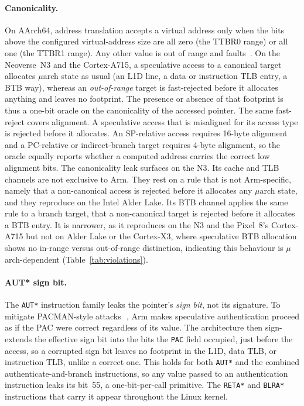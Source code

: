 \documentclass[letterpaper,twocolumn,10pt]{article}
\makeatletter
\theoremstyle{definition}
\def\uarch@bold#1#2\@nil{\if b#1\boldmath\fi}
\DeclareRobustCommand{\uarch}{{\expandafter\uarch@bold\f@series\@nil\ensuremath{\mu}}arch\xspace}
\makeatother
\begin{document}
\paragraph{Canonicality.}
\label{sec:canon-l1d}
On AArch64, address translation accepts a virtual address only when the bits above the
configured virtual-address size are all zero (the TTBR0 range) or all one (the TTBR1 range).
Any other value is out of range and faults~\cite{arm_vmsa}. On the
Neoverse~N3 and the Cortex-A715, a speculative access to a canonical target allocates
\uarch state as usual (an L1D line, a data or instruction TLB entry, a BTB
way), whereas an \emph{out-of-range} target is fast-rejected before it allocates
anything and leaves no footprint. The presence or absence of that footprint is thus a one-bit
oracle on the canonicality of the accessed pointer. The same fast-reject covers
alignment. A speculative access that is misaligned for its access type is rejected
before it allocates. An SP-relative access requires 16-byte alignment and a
PC-relative or indirect-branch target requires 4-byte alignment, so the oracle equally
reports whether a computed address carries the correct low alignment bits.
The canonicality leak surfaces on the N3. Its cache and TLB channels are not exclusive to Arm.
They rest on a rule that is not Arm-specific, namely that a non-canonical access is rejected
before it allocates any \uarch state, and they reproduce on the Intel Alder
Lake. Its BTB channel applies the same rule to a branch target, that a non-canonical
target is rejected before it allocates a BTB entry. It is narrower, as it reproduces on the N3
and the Pixel~8's Cortex-A715 but not on Alder Lake or the Cortex-X3, where speculative BTB
allocation shows no in-range versus out-of-range distinction, indicating this behaviour is
\uarch-dependent (Table~\ref{tab:violations}).

\paragraph{AUT* sign bit.}
The \texttt{AUT*} instruction family leaks the pointer's \emph{sign bit}, not its signature.
To mitigate PACMAN-style attacks~\cite{pacman}\,\cite{arm_pacman}, Arm makes speculative
authentication proceed as if the PAC were correct regardless of its value. The architecture then sign-extends the effective
sign bit into the bits the \texttt{PAC} field occupied, just before the access, so a corrupted
sign bit leaves no footprint in the L1D, data TLB, or instruction TLB, unlike a correct one. This
holds for both \texttt{AUT*} and the combined authenticate-and-branch instructions, so any value
passed to an authentication instruction leaks its bit~55, a one-bit-per-call primitive. The
\texttt{RETA*} and \texttt{BLRA*} instructions that carry it appear throughout the Linux kernel.
\end{document}
